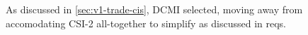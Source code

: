As discussed in \autoref{sec:v1-trade-cis}, DCMI selected, moving away from accomodating CSI-2 all-together to simplify as discussed in reqs.